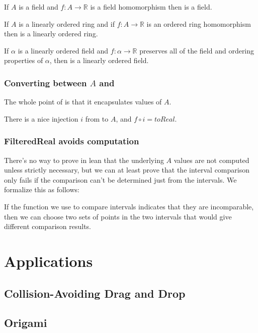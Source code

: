 \begin{lemma}
  \label{thm:filteredField}
  If $A$ is a field and $f : A → ℝ$ is a field homomorphism then 
  is a field.
\end{lemma}

\begin{lemma}
  \label{thm:filteredOrderedRing}
  If $A$ is a linearly ordered ring and if $f : A → ℝ$ is an ordered ring homomorphism then
   is a linearly ordered ring.
\end{lemma}

\begin{theorem}
  \label{thm:filteredOrderedField}
  If $α$ is a linearly ordered field and $f : α → ℝ$ preserves all of the field
  and ordering properties of $α$, then  is a linearly
  ordered field.
\end{theorem}

\subsection{Converting between $A$ and }

The whole point of  is that it encapsulates values of
$A$.

\begin{definition}
  \label{def:filteredEquivalent}
  \notready
  There is a nice injection $i$ from  to
  $A$, and $f \circ i = toReal$.
\end{definition}

\subsection{FilteredReal avoids computation}

There's no way to prove in lean that the underlying $A$ values are not computed
unless strictly necessary, but we can at least prove that the interval
comparison only fails if the comparison can't be determined just from the
intervals. We formalize this as follows:

\begin{lemma}
  \label{thm:compareComplete}
  If the function we use to compare intervals indicates that they are
  incomparable, then we can choose two sets of points in the two intervals that
  would give different comparison results.
\end{lemma}

\chapter{Applications}

\section{Collision-Avoiding Drag and Drop}

\section{Origami}



